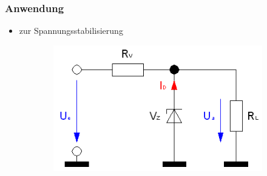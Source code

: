 \begin{frame}
  \frametitle{Anwendung}
  \begin{itemize}
    \item zur Spannungsstabilisierung
  \end{itemize}
  \begin{center}
    \begin{figure}
      \begin{figure}
        \includegraphics[width=\textwidth,height=.7\textheight,keepaspectratio]{e12/Spannungsstabilisierung.png}
      \end{figure}
    \end{figure}
  \end{center}
\end{frame}

